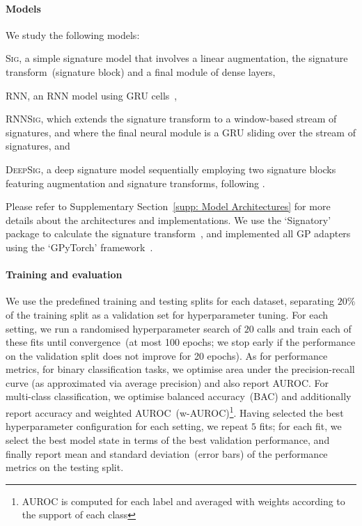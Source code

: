 \documentclass{article}
\begin{document}
\paragraph{Models}
%
We study the following models:
\begin{inparaenum}[(1)]
  \item \textsc{Sig}, a simple signature model that involves a linear
    augmentation, the signature transform~(signature block) and a final
    module of dense layers,
  \item \textsc{RNN}, an RNN model using GRU cells~\citep{cho2014learning},
  \item \textsc{RNNSig}, which extends the signature transform to a window-based
    stream of signatures, and where the final neural module is a GRU
    sliding over the stream of signatures, and
  \item \textsc{DeepSig}, a deep signature model sequentially employing two signature blocks featuring augmentation and signature transforms,
  following \citet{kidger2019deep}.
\end{inparaenum}
%
Please refer to Supplementary Section~\ref{supp: Model Architectures} for more details about the
architectures and implementations. We use the `Signatory' package to
calculate the signature transform~\citep{signatory}, and implemented all GP
adapters using the `GPyTorch' framework~\citep{gardner2018gpytorch}.

\paragraph{Training and evaluation}
%
We use the predefined training and testing splits for each dataset,
separating $20\%$ of the training split as a validation set for
hyperparameter tuning.
%
For each setting, we run a randomised hyperparameter search of $20$
calls and train each of these fits until convergence~(at most 100
epochs; we stop early if the performance on the validation
split does not improve for 20 epochs). As for performance metrics, for
binary classification tasks, we optimise area under the precision-recall curve (as approximated via average precision) and also report AUROC. For multi-class
classification, we optimise balanced accuracy~(BAC) and additionally
report accuracy and weighted AUROC~(w-AUROC)\footnote{%
  AUROC is computed for each label and averaged with weights according to
  the support of each class%
}.
%
Having selected the best hyperparameter configuration for each setting,
we repeat $5$ fits; for each fit, we select the best model state in
terms of the best validation performance, and finally report mean and
standard deviation~(error bars) of the performance metrics on the
testing split.
\end{document}
